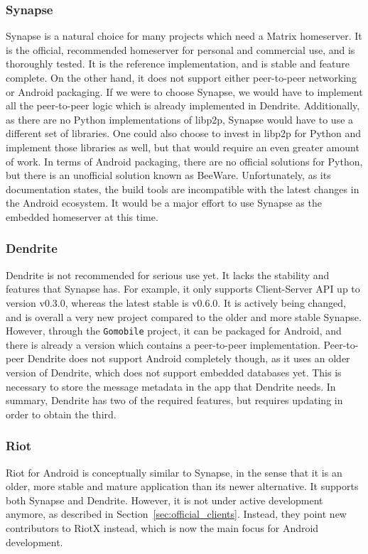\subsubsection{Synapse}
Synapse is a natural choice for many projects which need a Matrix homeserver.
It is the official, recommended homeserver for personal and commercial use, and is thoroughly tested.
It is the reference implementation, and is stable and feature complete.
On the other hand, it does not support either peer-to-peer networking or Android packaging.
If we were to choose Synapse, we would have to implement all the peer-to-peer logic which is already implemented in Dendrite.
Additionally, as there are no Python implementations of libp2p, Synapse would have to use a different set of libraries.
One could also choose to invest in libp2p for Python and implement those libraries as well, but that would require an even greater amount of work.
In terms of Android packaging, there are no official solutions for Python, but there is an unofficial solution known as BeeWare\cite{beeware}.
Unfortunately, as its documentation states\cite{beeware_docs}, the build tools are incompatible with the latest changes in the Android ecosystem.
It would be a major effort to use Synapse as the embedded homeserver at this time.

\subsubsection{Dendrite}
Dendrite is not recommended for serious use yet.
It lacks the stability and features that Synapse has.
For example, it only supports Client-Server API up to version v0.3.0, whereas the latest stable is v0.6.0.
It is actively being changed, and is overall a very new project compared to the older and more stable Synapse.
However, through the \texttt{Gomobile} project, it can be packaged for Android, and there is already a version which contains a peer-to-peer implementation.
Peer-to-peer Dendrite does not support Android completely though, as it uses an older version of Dendrite, which does not support embedded databases yet.
This is necessary to store the message metadata in the app that Dendrite needs.
In summary, Dendrite has two of the required features, but requires updating in order to obtain the third.

\subsubsection{Riot}
Riot for Android is conceptually similar to Synapse, in the sense that it is an older, more stable and mature application than its newer alternative.
It supports both Synapse and Dendrite.
However, it is not under active development anymore, as described in Section~\ref{sec:official_clients}.
Instead, they point new contributors to RiotX instead, which is now the main focus for Android development.

